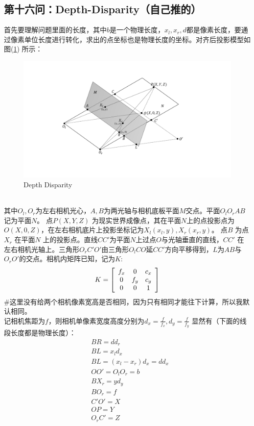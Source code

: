 \documentclass[UTF8]{ctexart}
\begin{document}
\subsection{第十六问：Depth-Disparity（自己推的）}
首先要理解问题里面的长度，其中$b$是一个物理长度，$x_l,x_r,d$都是像素长度，要通过像素单位长度进行转化，求出的点坐标也是物理长度的坐标。对齐后投影模型如图(\ref{fig:Depth_Disparity}) 所示：
\begin{figure}[htp]%
	\centering  %
	\includegraphics[width=0.7\linewidth]{./figures/Depth_Disparity.pdf} %
	\caption{Depth Disparity}  %
	\label{fig:Depth_Disparity}   %
\end{figure}\\
其中$O_l,O_r$为左右相机光心，$A,B$为两光轴与相机底板平面$M$交点。平面$O_lO_rAB$ 记为平面$N$。 点$P(X,Y,Z)$ 为现实世界成像点，其在平面$N$上的点投影点为$O(X,0,Z)$，在左右相机底片上投影坐标记为$X_l(x_l,y),X_r(x_r,y)$。 点$B$ 为点$X_r$ 在平面$N$ 上的投影点。直线$CC'$为平面$N$上过点$O$与光轴垂直的直线，$CC'$ 在左右相机光轴上。三角形$O_rC'O'$由三角形$O_lCO$延$CC'$方向平移得到，$L$为$AB$与$O_rO'$的交点。相机内矩阵已知，记为$K$:
$$K = \left [ \begin{array}{ c c c}
f_x & 0   & c_x \\
0  & f_y & c_y \\
0  & 0   & 1 \\
\end{array} \right ]$$
\#这里没有给两个相机像素宽高是否相同，因为只有相同才能往下计算，所以我默认相同。\\
记相机焦距为$f$，则相机单像素宽度高度分别为$d_x=\frac{f}{f_x},d_y=\frac{f}{f_y}$
显然有（下面的线段长度都是物理长度）：
\begin{align*}
&BR=dd_r\\
&BL=x_ld_x\\
&BL=(x_l-x_r)d_x=dd_x\\
&OO'=O_lO_r=b\\
&BX_r=yd_y\\
&BO_r=f\\
&C'O'=X\\
&OP=Y\\
&O_rC'=Z
\end{align*}
\end{document}
